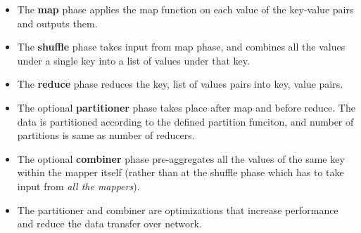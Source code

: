 \documentclass{article}
\begin{document}
\begin{itemize}
        \item The \textbf{map} phase applies the map function on each value of the key-value pairs and outputs them.
    
        \item The \textbf{shuffle} phase takes input from map phase, and combines all the values under a single key into a list of values under that key.
        
        \item The \textbf{reduce} phase reduces the key, list of values pairs into key, value pairs.   
        
        \item The optional \textbf{partitioner} phase takes place after map and before reduce. The data is partitioned according to the defined partition funciton, and number of partitions is same as number of reducers. 
        
        \item The optional \textbf{combiner} phase pre-aggregates all the values of the same key within the mapper itself (rather than at the shuffle phase which has to take input from \textit{all the mappers}).
        
        \item The partitioner and combiner are optimizations that increase performance and reduce the data transfer over network. 
\end{itemize}
\end{document}
